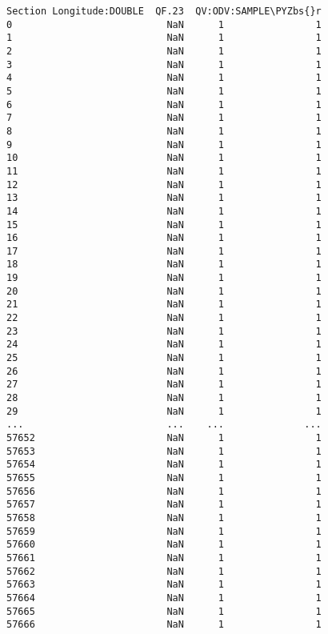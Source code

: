 \documentclass[a4paper,11pt,final]{article}
\def\PYZbs{\char`\\}
\begin{document}
\begin{Verbatim}[commandchars=\\\{\},frame=leftline,fontsize=\small, xleftmargin=0.5em]
       Section Longitude:DOUBLE  QF.23  QV:ODV:SAMPLE\PYZbs{}r
0                           NaN      1                1
1                           NaN      1                1
2                           NaN      1                1
3                           NaN      1                1
4                           NaN      1                1
5                           NaN      1                1
6                           NaN      1                1
7                           NaN      1                1
8                           NaN      1                1
9                           NaN      1                1
10                          NaN      1                1
11                          NaN      1                1
12                          NaN      1                1
13                          NaN      1                1
14                          NaN      1                1
15                          NaN      1                1
16                          NaN      1                1
17                          NaN      1                1
18                          NaN      1                1
19                          NaN      1                1
20                          NaN      1                1
21                          NaN      1                1
22                          NaN      1                1
23                          NaN      1                1
24                          NaN      1                1
25                          NaN      1                1
26                          NaN      1                1
27                          NaN      1                1
28                          NaN      1                1
29                          NaN      1                1
...                         ...    ...              ...
57652                       NaN      1                1
57653                       NaN      1                1
57654                       NaN      1                1
57655                       NaN      1                1
57656                       NaN      1                1
57657                       NaN      1                1
57658                       NaN      1                1
57659                       NaN      1                1
57660                       NaN      1                1
57661                       NaN      1                1
57662                       NaN      1                1
57663                       NaN      1                1
57664                       NaN      1                1
57665                       NaN      1                1
57666                       NaN      1                1

\end{Verbatim}
\end{document}
